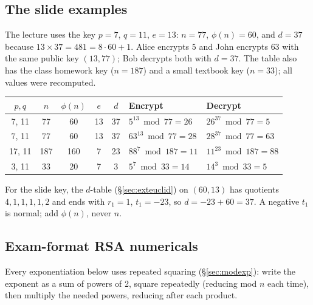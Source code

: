 \subsection{The slide examples \new}
The lecture uses the key $p = 7$, $q = 11$, $e = 13$: $n = 77$, $\phi(n) = 60$, and $d = 37$ because $13 \times 37 = 481 = 8 \cdot 60 + 1$. Alice encrypts $5$ and John encrypts $63$ with the same public key $(13, 77)$; Bob decrypts both with $d = 37$. The table also has the class homework key ($n = 187$) and a small textbook key ($n = 33$); all values were recomputed.
\begin{center}\small
\begin{tabular}{@{}cccccll@{}}
\toprule
$p, q$ & $n$ & $\phi(n)$ & $e$ & $d$ & Encrypt & Decrypt\\
\midrule
7, 11 & 77 & 60 & 13 & 37 & $5^{13} \bmod 77 = 26$ & $26^{37} \bmod 77 = 5$\\
7, 11 & 77 & 60 & 13 & 37 & $63^{13} \bmod 77 = 28$ & $28^{37} \bmod 77 = 63$\\
17, 11 & 187 & 160 & 7 & 23 & $88^{7} \bmod 187 = 11$ & $11^{23} \bmod 187 = 88$\\
3, 11 & 33 & 20 & 7 & 3 & $5^7 \bmod 33 = 14$ & $14^3 \bmod 33 = 5$\\
\bottomrule
\end{tabular}
\end{center}
For the slide key, the $d$-table (\S\ref{sec:exteuclid}) on $(60, 13)$ has quotients $4, 1, 1, 1, 1, 2$ and ends with $r_1 = 1$, $t_1 = -23$, so $d = -23 + 60 = 37$. A negative $t_1$ is normal; add $\phi(n)$, never $n$.

\subsection{Exam-format RSA numericals \hot}

Every exponentiation below uses repeated squaring (\S\ref{sec:modexp}): write the exponent as a sum of powers of 2, square repeatedly (reducing mod $n$ each time), then multiply the needed powers, reducing after each product.

